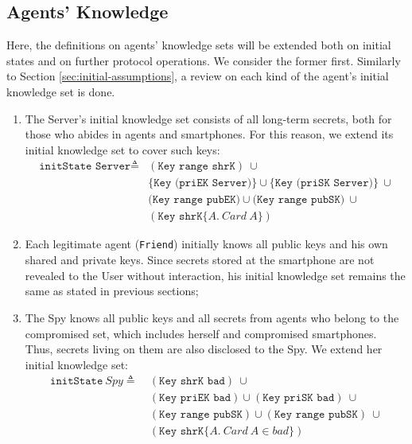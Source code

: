 \subsection{Agents' Knowledge}
Here, the definitions on agents' knowledge sets will be extended both on initial states and on further protocol operations. We consider the former first. Similarly to Section \ref{sec:initial-assumptions}, a review on each kind of the agent's initial knowledge set is done.

\begin{enumerate}
  \item The Server's initial knowledge set consists of all long-term secrets, both for those who abides in agents and smartphones. For this reason, we extend its initial knowledge set to cover such keys:
  \begin{equation*}
    \begin{split}
      \texttt{initState Server} \triangleq
      & (\texttt{Key range shrK}) \  \cup \\
      & \{\texttt{Key (priEK Server)}\} \cup \{\texttt{Key (priSK Server)}\}\  \cup \\
      & \texttt{(Key range pubEK)} \cup \texttt{(Key range pubSK)}\ \cup \\
      & (\texttt{Key shrK}\{A.\ Card\ A\})
    \end{split}
  \end{equation*}
  \item Each legitimate agent (\texttt{Friend}) initially knows all public keys and his own shared and private keys. Since secrets stored at the smartphone are not revealed to the User without interaction, his initial knowledge set remains the same as stated in previous sections;

  \item The Spy knows all public keys and all secrets from agents who belong to the compromised set, which includes herself and compromised smartphones. Thus, secrets living on them are also disclosed to the Spy. We extend her initial knowledge set:
  \begin{equation*}
    \begin{split}
      \texttt{initState}\ Spy \triangleq \
      & (\texttt{Key shrK bad}) \ \cup \\
      & (\texttt{Key priEK bad}) \cup (\texttt{Key priSK bad}) \ \cup \\
      & (\texttt{Key range pubSK}) \cup (\texttt{Key range pubSK})\ \cup \\
      & (\texttt{Key shrK}\{A.\ Card\ A \in bad\})
    \end{split}
  \end{equation*}
\end{enumerate}

%
